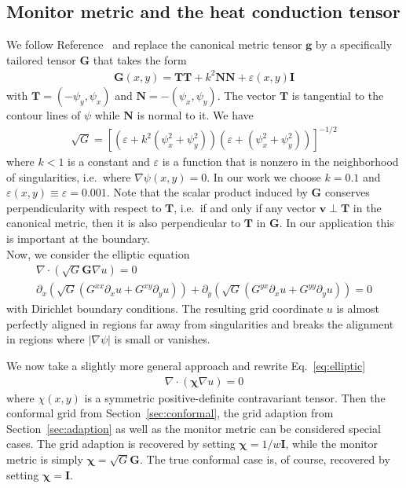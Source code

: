 \documentclass{hitec} %
\newcommand{\eps}{\varepsilon}
\renewcommand{\vec}[1]{{\mathbf{#1}}}
\begin{document}
\subsection{Monitor metric and the heat conduction tensor} \label{sec:metric}
We follow Reference~\cite{Liseikin, Glasser2006, Vaseva2009} and replace the canonical metric tensor $\vec g$ by
a specifically tailored tensor $\vec G$ that takes the form
\begin{align}
\vec G(x,y) = \vec T \vec T + k^2\vec N \vec N + \eps(x,y)\vec I
\label{eq:metric}
\end{align}
with $\vec T = (-\psi_y, \psi_x)$ and $\vec N = -(\psi_x, \psi_y)$. 
The vector $\vec T$ is tangential to the contour lines of $\psi$ while $\vec N$ is 
normal to it. 
We have 
\begin{align}
  \sqrt{G} = \left[(\eps+k^2(\psi_x^2+\psi_y^2))(\eps+(\psi_x^2+\psi_y^2))\right]^{-1/2}
  \label{}
\end{align}
where $k<1$ is a constant and $\eps$ is a function that is nonzero in the neighborhood
of singularities, i.e.~where $\nabla \psi(x,y)=0$.
In our work we choose $k=0.1$ and $\eps(x,y)\equiv\eps =0.001$.
Note that the scalar product induced by $\vec G$ conserves perpendicularity 
with respect to $\vec T$, i.e.~if
and only if
 any vector $\vec v \perp \vec T$ in the canonical metric, then it is also perpendicular to $\vec T$ in $\vec G$.
In our application this is important at the boundary.\\
%
Now, we consider the elliptic equation
\begin{align}
  \nabla\cdot(\sqrt{G}\vec G \nabla u) = 0\nonumber\\
  \partial_x(\sqrt{G} (G^{xx}\partial_x u + G^{xy}\partial_y u )) + \partial_y(\sqrt{G}(G^{yx}\partial_x u + G^{yy}\partial_y u )) = 0
  \label{eq:elliptic}
\end{align}
with Dirichlet boundary conditions. %
The resulting grid coordinate $u$ is almost perfectly aligned in regions
far away from singularities and breaks the alignment in regions where $|\nabla\psi|$ is small or vanishes.

We now take a slightly more general approach and rewrite Eq.~\eqref{eq:elliptic}
\begin{align}
  \nabla\cdot(\vec \chi \nabla u) = 0
  \label{eq:elliptic_mod}
\end{align}
where $\chi(x,y)$ is a symmetric positive-definite contravariant tensor. 
Then the conformal grid from Section~\ref{sec:conformal}, the grid adaption from Section~\ref{sec:adaption} as 
well as the monitor metric can be considered special cases. 
The grid adaption is recovered by setting $\vec \chi = 1/w\vec I$,
while the monitor metric is simply $\vec \chi = \sqrt{G}\vec G$. 
The true conformal case is, of course, recovered by setting $\vec \chi = \vec I$. 
\end{document}
